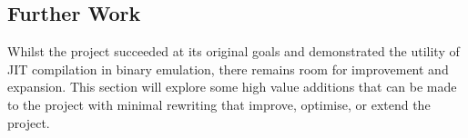 \subsection{Further Work}

Whilst the project succeeded at its original goals and demonstrated the utility of JIT compilation in binary emulation, there remains room for improvement and expansion. This section will explore some high value additions that can be made to the project with minimal rewriting that improve, optimise, or extend the project. 





